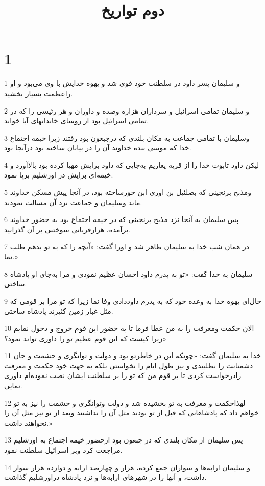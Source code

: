 

\title{دوم تواريخ}

 
\chapter{1}

\par 1 و سلیمان پسر داود در سلطنت خود قوی شد و یهوه خدایش با وی می‌بود و او راعظمت بسیار بخشید.
\par 2 و سلیمان تمامی اسرائیل و سرداران هزاره وصده و داوران و هر رئیسی را که در تمامی اسرائیل بود از روسای خاندانهای آبا خواند.
\par 3 وسلیمان با تمامی جماعت به مکان بلندی که درجبعون بود رفتند زیرا خیمه اجتماع خدا که موسی بنده خداوند آن را در بیابان ساخته بود درآنجا بود.
\par 4 لیکن داود تابوت خدا را از قریه یعاریم به‌جایی که داود برایش مهیا کرده بود بالاآورد و خیمه‌ای برایش در اورشلیم برپا نمود.
\par 5 ومذبح برنجینی که بصلئیل بن اوری ابن حورساخته بود، در آنجا پیش مسکن خداوند ماند وسلیمان و جماعت نزد آن مسالت نمودند.
\par 6 پس سلیمان به آنجا نزد مذبح برنجینی که در خیمه اجتماع بود به حضور خداوند برآمده، هزارقربانی سوختنی بر آن گذرانید.
\par 7 در همان شب خدا به سلیمان ظاهر شد و اورا گفت: «آنچه را که به تو بدهم طلب نما.»
\par 8 سلیمان به خدا گفت: «تو به پدرم داود احسان عظیم نمودی و مرا به‌جای او پادشاه ساختی.
\par 9 حال‌ای یهوه خدا به وعده خود که به پدرم داوددادی وفا نما زیرا که تو مرا بر قومی که مثل غبار زمین کثیرند پادشاه ساختی.
\par 10 الان حکمت ومعرفت را به من عطا فرما تا به حضور این قوم خروج و دخول نمایم زیرا کیست که این قوم عظیم تو را داوری تواند نمود؟»
\par 11 خدا به سلیمان گفت: «چونکه این در خاطرتو بود و دولت و توانگری و حشمت و جان دشمنانت را نطلبیدی و نیز طول ایام را نخواستی بلکه به جهت خود حکمت و معرفت رادرخواست کردی تا بر قوم من که تو را بر سلطنت ایشان نصب نموده‌ام داوری نمایی.
\par 12 لهذاحکمت و معرفت به تو بخشیده شد و دولت وتوانگری و حشمت را نیز به تو خواهم داد که پادشاهانی که قبل از تو بودند مثل آن را نداشتند وبعد از تو نیز مثل آن را نخواهند داشت.»
\par 13 پس سلیمان از مکان بلندی که در جبعون بود ازحضور خیمه اجتماع به اورشلیم مراجعت کرد وبر اسرائیل سلطنت نمود.
\par 14 و سلیمان ارابه‌ها و سواران جمع کرده، هزار و چهارصد ارابه و دوازده هزار سوار داشت، و آنها را در شهرهای ارابه‌ها و نزد پادشاه دراورشلیم گذاشت.
